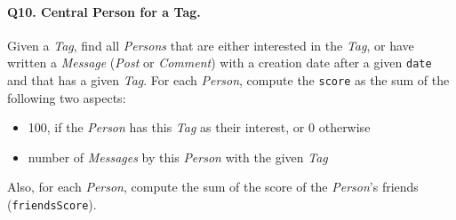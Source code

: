 \paragraph{\textbf{Q10}. Central Person for a Tag.}
Given a \emph{Tag}, find all \emph{Persons} that are either interested
in the \emph{Tag}, or have written a \emph{Message} (\emph{Post} or
\emph{Comment}) with a creation date after a given \texttt{date} and
that has a given \emph{Tag}. For each \emph{Person}, compute the
\texttt{score} as the sum of the following two aspects:
\begin{itemize}
\tightlist
\item
  100, if the \emph{Person} has this \emph{Tag} as their interest, or 0
  otherwise
\item
  number of \emph{Messages} by this \emph{Person} with the given
  \emph{Tag}
\end{itemize}
Also, for each \emph{Person}, compute the sum of the score of the
\emph{Person}'s friends (\texttt{friendsScore}).
